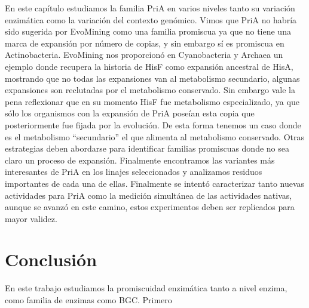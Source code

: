 \documentclass[12pt,twoside]{reedthesis}
\begin{document}
  En este capítulo estudiamos la familia PriA en varios niveles tanto su
  variación enzimática como la variación del contexto genómico. Vimos que
  PriA no habría sido sugerida por EvoMining como una familia promiscua ya
  que no tiene una marca de expansión por número de copias, y sin embargo
  sí es promiscua en Actinobacteria. EvoMining nos proporcionó en
  Cyanobacteria y Archaea un ejemplo donde recupera la historia de HisF
  como expansión ancestral de HisA, mostrando que no todas las expansiones
  van al metabolismo secundario, algunas expansiones son reclutadas por el
  metabolismo conservado. Sin embargo vale la pena reflexionar que en su
  momento HisF fue metabolismo especializado, ya que sólo los organismos
  con la expansión de PriA poseían esta copia que posteriormente fue
  fijada por la evolución. De esta forma tenemos un caso donde es el
  metabolismo ``secundario'' el que alimenta al metabolismo conservado.
  Otras estrategias deben abordarse para identificar familias promiscuas
  donde no sea claro un proceso de expansión. Finalmente encontramos las
  variantes más interesantes de PriA en los linajes seleccionados y
  analizamos residuos importantes de cada una de ellas. Finalmente se
  intentó caracterizar tanto nuevas actividades para PriA como la medición
  simultánea de las actividades nativas, aunque se avanzó en este camino,
  estos experimentos deben ser replicados para mayor validez.
  
  \chapter*{Conclusión}\label{conclusion}
  
  \setcounter{chapter}{4} \setcounter{section}{0}
  
  En este trabajo estudiamos la promiscuidad enzimática tanto a nivel
  enzima, como familia de enzimas como BGC. Primero
  
\end{document}
